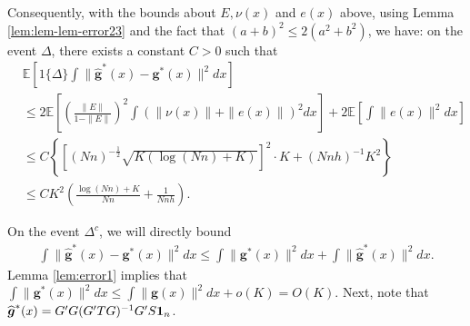 \documentclass[preprint,11pt]{article}
\newcommand{\mbb}{\mathbb}
\newcommand{\bg}{{\boldsymbol g}}
\numberwithin{equation}{section}
\begin{document}
Consequently, with the bounds about $E,\nu(x)$ and $e(x)$ above, using Lemma \ref{lem:lem-lem-error23} and the fact that $(a+b)^2\le 2(a^2+b^2)$, we have: on the event $\Delta$, there exists a constant $C>0$ such that
\begin{align*}
    &\mbb{E}\left[1\{\Delta\}\int \|\bm{\widehat{g}}^*(x)-\bm{g}^*(x)\|^2dx\right]\\
    &\le 2\mbb{E}\left[\left(\frac{\|E\|}{1-\|E\|}\right)^2\int (\|\nu(x)\|+\|e(x)\|)^2dx\right]+2\mbb{E}\left[\int \|e(x)\|^2dx\right]\\
    &\le C\left\{\left[(Nn)^{-\frac{1}{2}}\sqrt{K(\log (Nn) +K)}\right]^2\cdot K+(Nnh)^{-1}K^2\right\}\\
    &\le CK^2\left(\frac{\log (Nn)+K}{Nn}+\frac{1}{Nnh}\right).
\end{align*}

On the event $\Delta^c$, we will directly bound 
\begin{align*}
    \int \|\bm{\widehat{g}}^*(x)-\bm{g}^*(x)\|^2dx\le \int \|\bm{g}^*(x)\|^2dx+\int \|\bm{\widehat{g}}^*(x)\|^2dx.
\end{align*}
Lemma \ref{lem:error1} implies that $\int \|\bm{g}^*(x)\|^2dx\le \int \|\bm{g}(x)\|^2dx+o(K)=O(K)$. Next, note that
$\widehat{\bg}^*(x)=G'G(G'TG)^{-1}G'S{\bf 1}_n$. 
\end{document}

